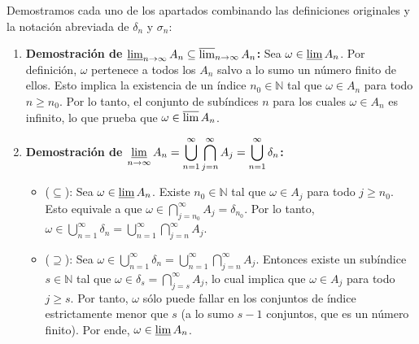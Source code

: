\begin{demostracion}
Demostramos cada uno de los apartados combinando las definiciones originales y la notación abreviada de $\delta_n$ y $\sigma_n$:

\begin{enumerate}[label=\alph*)]
    \item \textbf{Demostración de $\varliminf_{n \to \infty} A_n \subseteq \varlimsup_{n \to \infty} A_n$:} Sea $\omega \in \varliminf A_n$. Por definición, $\omega$ pertenece a todos los $A_n$ salvo a lo sumo un número finito de ellos. Esto implica la existencia de un índice $n_0 \in \mathbb{N}$ tal que $\omega \in A_n$ para todo $n \ge n_0$. Por lo tanto, el conjunto de subíndices $n$ para los cuales $\omega \in A_n$ es infinito, lo que prueba que $\omega \in \varlimsup A_n$.

    \item \textbf{Demostración de $\displaystyle \varliminf_{n \to \infty} A_n = \bigcup_{n=1}^\infty \bigcap_{j=n}^\infty A_j = \bigcup_{n=1}^\infty \delta_n$:}
    \begin{itemize}
        \item ($\subseteq$): Sea $\omega \in \varliminf A_n$. Existe $n_0 \in \mathbb{N}$ tal que $\omega \in A_j$ para todo $j \ge n_0$. Esto equivale a que $\omega \in \bigcap_{j=n_0}^\infty A_j = \delta_{n_0}$. Por lo tanto, $\omega \in \bigcup_{n=1}^\infty \delta_n = \bigcup_{n=1}^\infty \bigcap_{j=n}^\infty A_j$.
        \item ($\supseteq$): Sea $\omega \in \bigcup_{n=1}^\infty \delta_n = \bigcup_{n=1}^\infty \bigcap_{j=n}^\infty A_j$. Entonces existe un subíndice $s \in \mathbb{N}$ tal que $\omega \in \delta_s = \bigcap_{j=s}^\infty A_j$, lo cual implica que $\omega \in A_j$ para todo $j \ge s$. Por tanto, $\omega$ sólo puede fallar en los conjuntos de índice estrictamente menor que $s$ (a lo sumo $s-1$ conjuntos, que es un número finito). Por ende, $\omega \in \varliminf A_n$.
    \end{itemize}


\end{enumerate}
\end{demostracion}
